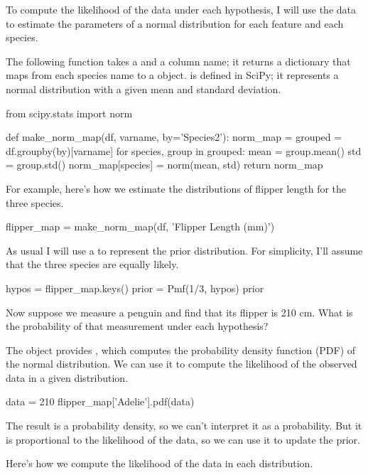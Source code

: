\documentclass[12pt]{book}
\theoremstyle{exercise}
\begin{document}
To compute the likelihood of the data under each hypothesis, I will use
the data to estimate the parameters of a normal distribution for each
feature and each species.

The following function takes a  and a
column name; it returns a dictionary that maps from each species name to
a  object. 
is defined in SciPy; it represents a normal distribution with a given
mean and standard deviation.

\begin{code}
from scipy.stats import norm

def make_norm_map(df, varname, by='Species2'):
    norm_map = {}
    grouped = df.groupby(by)[varname]
    for species, group in grouped:
        mean = group.mean()
        std = group.std()
        norm_map[species] = norm(mean, std)
    return norm_map
\end{code}

For example, here's how we estimate the distributions of flipper length
for the three species.

\begin{code}
flipper_map = make_norm_map(df, 'Flipper Length (mm)')
\end{code}

As usual I will use a  to represent the
prior distribution. For simplicity, I'll assume that the three species
are equally likely.

\begin{code}
hypos = flipper_map.keys()
prior = Pmf(1/3, hypos)
prior
\end{code}

Now suppose we measure a penguin and find that its flipper is 210 cm.
What is the probability of that measurement under each hypothesis?

The  object provides
, which computes the probability density
function (PDF) of the normal distribution. We can use it to compute the
likelihood of the observed data in a given distribution.

\begin{code}
data = 210
flipper_map['Adelie'].pdf(data)
\end{code}

The result is a probability density, so we can't interpret it as a
probability. But it is proportional to the likelihood of the data, so we
can use it to update the prior.

Here's how we compute the likelihood of the data in each distribution.
\end{document}
